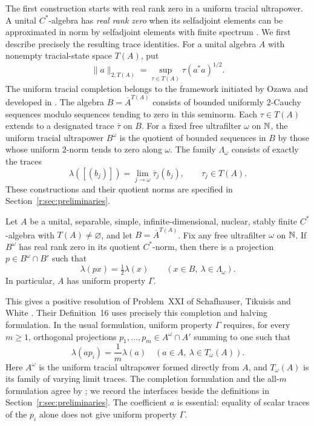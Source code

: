 The first construction starts with real rank zero in a uniform tracial
ultrapower. A unital $C^*$-algebra has \emph{real rank zero} when its
selfadjoint elements can be approximated in norm by selfadjoint elements
with finite spectrum \cite{BP91}. We first describe precisely
the resulting trace identities. For a unital algebra $A$ with nonempty
tracial-state space $T(A)$, put
\[
 \|a\|_{2,T(A)}=\sup_{\tau\in T(A)}\tau(a^*a)^{1/2}.
\]
The uniform tracial completion belongs to the framework initiated by
Ozawa \cite{Ozawa13} and developed in \cite{CCEGSTW}.
The algebra $B=\overline A^{T(A)}$ consists of bounded
uniformly $2$-Cauchy sequences modulo sequences tending to zero in this
seminorm. Each $\tau\in T(A)$ extends to a designated trace $\bar\tau$ on $B$.
For a fixed free ultrafilter $\omega$ on $\mathbb N$, the uniform tracial ultrapower
$B^\omega$ is the quotient of bounded sequences in $B$ by those whose uniform
$2$-norm tends to zero along $\omega$. The family $\Lambda_\omega$ consists
of exactly the traces
\[
 \lambda([(b_j)])=\lim_{j\to\omega}\bar\tau_j(b_j),
 \qquad \tau_j\in T(A).
\]
These constructions and their quotient norms are specified in
Section~\ref{r:sec:preliminaries}.

\begin{theorem}
\label{r:thm:main}
Let $A$ be a unital, separable, simple, infinite-dimensional, nuclear,
stably finite $C^*$-algebra with $T(A)\ne\varnothing$, and let
$B=\overline A^{T(A)}$. Fix any free ultrafilter $\omega$ on $\mathbb N$.
If $B^\omega$ has real rank zero in its quotient $C^*$-norm, then there is
a projection $p\in B^\omega\cap B'$ such that
\[
 \lambda(px)=\tfrac12\lambda(x)
 \qquad(x\in B,\ \lambda\in\Lambda_\omega).
\]
In particular, $A$ has uniform property $\Gamma$.
\end{theorem}

This gives a positive resolution of Problem~XXI of Schafhauser, Tikuisis
and White \cite[Section~6]{STW}. Their Definition~16 uses precisely this
completion and halving formulation. In the usual formulation, uniform
property $\Gamma$ requires, for every $m\ge1$, orthogonal projections
$p_1,\ldots,p_m\in A^\omega\cap A'$ summing to one such that
\[
 \lambda(ap_i)=\frac1m\lambda(a)
 \quad(a\in A,\ \lambda\in T_\omega(A)).
\]
Here $A^\omega$ is the uniform tracial ultrapower formed directly from $A$,
and $T_\omega(A)$ is its family of varying limit traces. The completion
formulation and the all-$m$ formulation agree by
\cite[Propositions~5.7, 5.20 and 5.23]{CCEGSTW}; we record the interfaces
beside the definitions in Section~\ref{r:sec:preliminaries}. The coefficient $a$ is essential: equality
of scalar traces of the $p_i$ alone does not give uniform property $\Gamma$.

